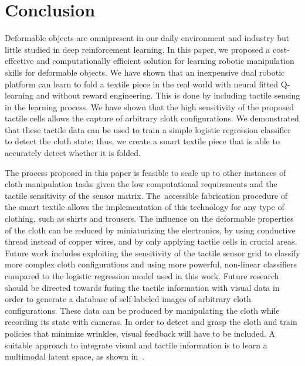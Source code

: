 \documentclass[\home/main.tex]{subfiles}
\begin{document}

\section{Conclusion}

Deformable objects are omnipresent in our daily environment and industry but little studied in deep reinforcement learning. In this paper, we proposed a cost-effective and computationally efficient solution for learning robotic manipulation skills for deformable objects. We have shown that an inexpensive dual robotic platform can learn to fold a textile piece in the real world with neural fitted Q-learning and without reward engineering. This is done by including tactile sensing in the learning process. We have shown that the high sensitivity of the proposed tactile cells allows the capture of arbitrary cloth configurations. We demonstrated that these tactile data can be used to train a simple logistic regression classifier to detect the cloth state; thus, we create a smart textile piece that is able to accurately detect whether it is folded.

The process proposed in this paper is feasible to scale up to other instances of cloth manipulation tasks given the low computational requirements and the tactile sensitivity of the sensor matrix. The~accessible fabrication procedure of the smart textile allows the implementation of this technology for any type of clothing, such as shirts and trousers. The influence on the deformable properties of the cloth can be reduced by miniaturizing the electronics, by using conductive thread instead of copper wires, and by only applying tactile cells in crucial areas. Future work includes exploiting the sensitivity of the tactile sensor grid to classify more complex cloth configurations and using more powerful, non-linear classifiers compared to the logistic regression model used in this work. Future research should be directed towards fusing the tactile information with visual data in order to generate a database of self-labeled images of arbitrary cloth configurations. These data can be produced by manipulating the cloth while recording its state with cameras. In order to detect and grasp the cloth and train policies that minimize wrinkles, visual feedback will have to be included. A suitable approach to integrate visual and tactile information is to learn a multimodal latent space, as shown in~\cite{Lee2019}.
\end{document}
